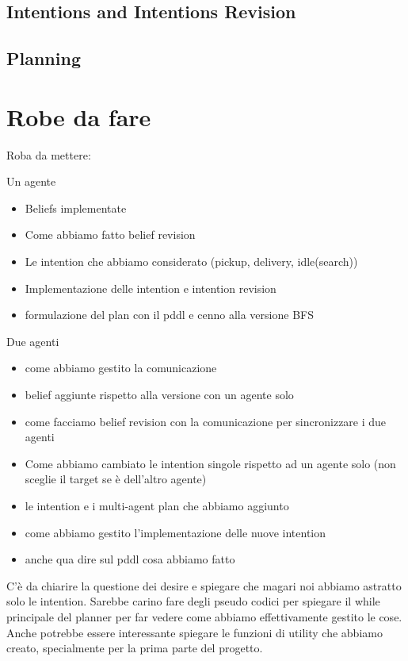 \documentclass[a4paper, 11pt]{article}
\begin{document}
\subsection{Intentions and Intentions Revision}


\subsection{Planning}






\pagebreak

\section{Robe da fare}

Roba da mettere:

Un agente
\begin{itemize}
\item Beliefs implementate
\item Come abbiamo fatto belief revision
\item Le intention che abbiamo considerato (pickup, delivery, idle(search))
\item Implementazione delle intention e intention revision
\item formulazione del plan con il pddl e cenno alla versione BFS
\end{itemize}

Due agenti
\begin{itemize}
\item come abbiamo gestito la comunicazione
\item belief aggiunte rispetto alla versione con un agente solo
\item come facciamo belief revision con la comunicazione per sincronizzare i due agenti
\item Come abbiamo cambiato le intention singole rispetto ad un agente solo (non sceglie il target se è dell'altro agente)
\item le intention e i multi-agent plan che abbiamo aggiunto
\item come abbiamo gestito l'implementazione delle nuove intention
\item anche qua dire sul pddl cosa abbiamo fatto
\end{itemize}

C'è da chiarire la questione dei desire e spiegare che magari noi abbiamo astratto solo le intention. Sarebbe carino fare degli pseudo codici per spiegare il while principale del planner per far vedere come abbiamo effettivamente gestito le cose. Anche potrebbe essere interessante spiegare le funzioni di utility che abbiamo creato, specialmente per la prima parte del progetto.





\pagebreak


\end{document}
